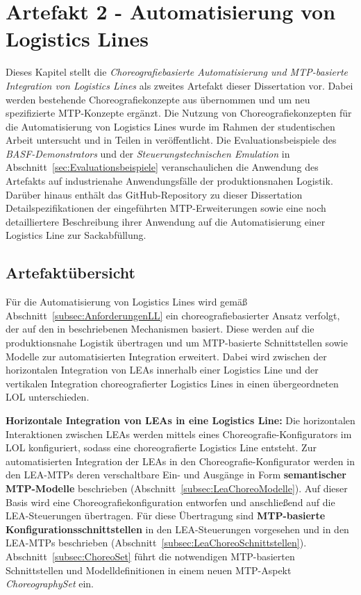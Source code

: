 \chapter{Artefakt 2 - Automatisierung von Logistics Lines}
\label{chap:Art2LL}

Dieses Kapitel stellt die \emph{Choreografiebasierte Automatisierung und MTP-ba\-sier\-te Integration von Logistics Lines} als zweites Artefakt dieser Dissertation vor. Dabei werden bestehende Choreografiekonzepte aus \cite{Stutz.2026,Stutz.2021} übernommen und um neu spezifizierte MTP-Konzepte ergänzt. Die Nutzung von Choreografiekonzepten für die Automatisierung von Logistics Lines wurde im Rahmen der studentischen Arbeit \cite{Ortmann.2021} untersucht und in Teilen in \cite{Blumenstein.ETFA,Blumenstein.MoProLog,Stutz.2022} veröffentlicht. Die Evaluationsbeispiele des \emph{BASF-Demonstrators} und der \emph{Steuerungstechnischen Emulation} in Abschnitt~\ref{sec:Evaluationsbeispiele} veranschaulichen die Anwendung des Artefakts auf industrienahe Anwendungsfälle der produktionsnahen Logistik. Darüber hinaus enthält das GitHub-Repository zu dieser Dissertation \cite{Blumenstein.Github} Detailspezifikationen der eingeführten MTP-Erweiterungen sowie eine noch detailliertere Beschreibung ihrer Anwendung auf die Automatisierung einer Logistics Line zur Sackabfüllung.

\section{Artefaktübersicht}
\label{sec:Art2LLUebersicht}

Für die Automatisierung von Logistics Lines wird gemäß Abschnitt~\ref{subsec:AnforderungenLL} ein choreografiebasierter Ansatz verfolgt, der auf den in \cite{Stutz.2021,Stutz.2026} beschriebenen Mechanismen basiert. Diese werden auf die produktionsnahe Logistik übertragen und um MTP-basierte Schnittstellen sowie Modelle zur automatisierten Integration erweitert. Dabei wird zwischen der horizontalen Integration von LEAs innerhalb einer Logistics Line und der vertikalen Integration choreografierter Logistics Lines in einen übergeordneten LOL unterschieden.

\pagebreak

\textbf{Horizontale Integration von LEAs in eine Logistics Line:} Die horizontalen Interaktionen zwischen LEAs werden mittels eines Choreografie-Konfigurators im LOL konfiguriert, sodass eine choreografierte Logistics Line entsteht. Zur automatisierten Integration der LEAs in den Choreografie-Konfigurator werden in den LEA-MTPs deren verschaltbare Ein- und Ausgänge in Form \textbf{semantischer MTP-Modelle} beschrieben (Abschnitt~\ref{subsec:LeaChoreoModelle}). Auf dieser Basis wird eine Choreografiekonfiguration entworfen und anschließend auf die LEA-Steuerungen übertragen. Für diese Übertragung sind \textbf{MTP-basierte Konfigurationsschnittstellen} in den LEA-Steuerungen vorgesehen und in den LEA-MTPs beschrieben (Abschnitt~\ref{subsec:LeaChoreoSchnittstellen}). Abschnitt~\ref{subsec:ChoreoSet} führt die notwendigen MTP-basierten Schnittstellen und Modelldefinitionen in einem neuen MTP-Aspekt \emph{ChoreographySet} ein.

